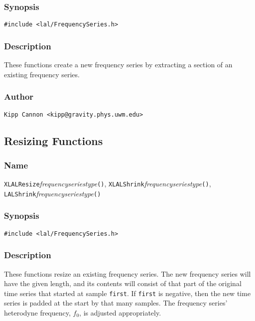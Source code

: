 \subsubsection{Synopsis}

\begin{verbatim}
#include <lal/FrequencySeries.h>
\end{verbatim}


\subsubsection{Description}

These functions create a new frequency series by extracting a section of an
existing frequency series.

\subsubsection{Author}

\verb|Kipp Cannon <kipp@gravity.phys.uwm.edu>|


\subsection{Resizing Functions}

\subsubsection{Name}

\texttt{XLALResize}\textit{frequencyseriestype}\texttt{()},
\texttt{XLALShrink}\textit{frequencyseriestype}\texttt{()},
\texttt{LALShrink}\textit{frequencyseriestype}\texttt{()}

\subsubsection{Synopsis}

\begin{verbatim}
#include <lal/FrequencySeries.h>
\end{verbatim}


\subsubsection{Description}

These functions resize an existing frequency series.  The new frequency
series will have the given length, and its contents will consist of that
part of the original time series that started at sample \texttt{first}.  If
\texttt{first} is negative, then the new time series is padded at the start
by that many samples.  The frequency series' heterodyne frequency,
\(f_{0}\), is adjusted appropriately.

